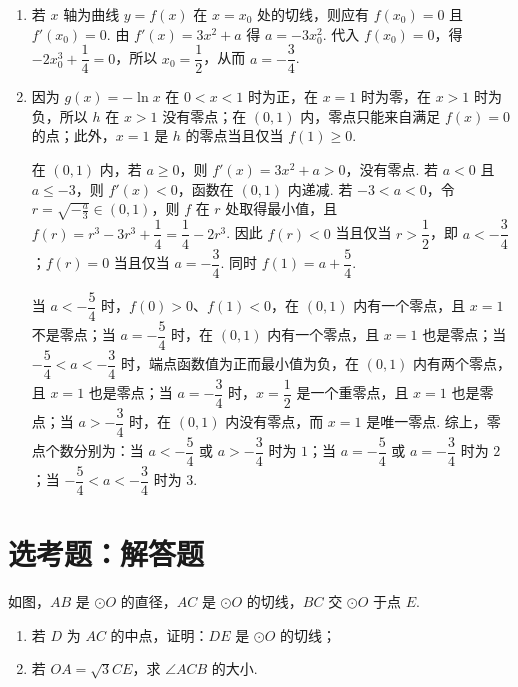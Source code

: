 \begin{solution}
\begin{enumerate}
\item 若 \(x\) 轴为曲线 \(y=f(x)\) 在 \(x=x_0\) 处的切线，则应有 \(f(x_0)=0\) 且 \(f'(x_0)=0\). 由 \(f'(x)=3x^2+a\) 得 \(a=-3x_0^2\). 代入 \(f(x_0)=0\)，得 \(-2x_0^3+\dfrac14=0\)，所以 \(x_0=\dfrac12\)，从而 \(a=-\dfrac34\).
\item 因为 \(g(x)=-\ln x\) 在 \(0<x<1\) 时为正，在 \(x=1\) 时为零，在 \(x>1\) 时为负，所以 \(h\) 在 \(x>1\) 没有零点；在 \((0,1)\) 内，零点只能来自满足 \(f(x)=0\) 的点；此外，\(x=1\) 是 \(h\) 的零点当且仅当 \(f(1)\geqslant0\).

在 \((0,1)\) 内，若 \(a\geqslant0\)，则 \(f'(x)=3x^2+a>0\)，没有零点. 若 \(a<0\) 且 \(a\leqslant-3\)，则 \(f'(x)<0\)，函数在 \((0,1)\) 内递减. 若 \(-3<a<0\)，令 \(r=\sqrt{-\frac{a}{3}}\in(0,1)\)，则 \(f\) 在 \(r\) 处取得最小值，且 \(f(r)=r^3-3r^3+\dfrac14=\dfrac14-2r^3\). 因此 \(f(r)<0\) 当且仅当 \(r>\dfrac12\)，即 \(a<-\dfrac34\)；\(f(r)=0\) 当且仅当 \(a=-\dfrac34\). 同时 \(f(1)=a+\dfrac54\).

当 \(a<-\dfrac54\) 时，\(f(0)>0\)、\(f(1)<0\)，在 \((0,1)\) 内有一个零点，且 \(x=1\) 不是零点；当 \(a=-\dfrac54\) 时，在 \((0,1)\) 内有一个零点，且 \(x=1\) 也是零点；当 \(-\dfrac54<a<-\dfrac34\) 时，端点函数值为正而最小值为负，在 \((0,1)\) 内有两个零点，且 \(x=1\) 也是零点；当 \(a=-\dfrac34\) 时，\(x=\dfrac12\) 是一个重零点，且 \(x=1\) 也是零点；当 \(a>-\dfrac34\) 时，在 \((0,1)\) 内没有零点，而 \(x=1\) 是唯一零点. 综上，零点个数分别为：当 \(a<-\dfrac54\) 或 \(a>-\dfrac34\) 时为 \(1\)；当 \(a=-\dfrac54\) 或 \(a=-\dfrac34\) 时为 \(2\)；当 \(-\dfrac54<a<-\dfrac34\) 时为 \(3\).
\end{enumerate}
\end{solution}

\section{选考题：解答题}

\begin{problem}
如图，\(AB\) 是 \(\odot O\) 的直径，\(AC\) 是 \(\odot O\) 的切线，\(BC\) 交 \(\odot O\) 于点 \(E\).

\begin{enumerate}
\item 若 \(D\) 为 \(AC\) 的中点，证明：\(DE\) 是 \(\odot O\) 的切线；
\item 若 \(OA = \sqrt{3}CE\)，求 \(\angle ACB\) 的大小.
\end{enumerate}

\end{problem}

